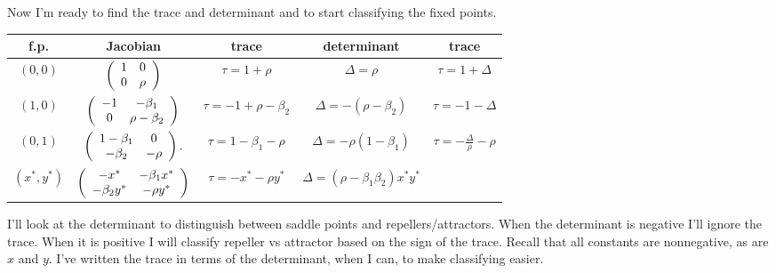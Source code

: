 \documentclass[12pt,letterpaper,answers]{exam}
\begin{document}
\begin{questions}
\begin{parts}
\begin{solution}

Now I'm ready to find the trace and determinant and to start classifying the fixed points.

\begin{tabular}{c | c| c| c| c}
f.p. & Jacobian & trace & determinant & trace \\
\hline
$(0,0)$ & $\left(\begin{array}{c c} 1 & 0 \\ 0 & \rho  \end{array}\right) $ & $\tau = 1+\rho$ & $\Delta = \rho$ & $\tau = 1 + \Delta$ \\
\hline
 $(1,0)$ & $\left(\begin{array}{c c}  -1 & -\beta_1 \\ 0 & \rho - \beta_2  \end{array}\right)$ & $\tau = -1 + \rho - \beta_2$ & $\Delta = -(\rho - \beta_2)$ & $\tau = -1 -\Delta$ \\
 \hline
 $(0,1)$ & $\left(\begin{array}{c c} 1-\beta_1 & 0 \\ -\beta_2 & - \rho   \end{array}\right).$ & $\tau = 1-\beta_1 - \rho$ & $\Delta = -\rho(1-\beta_1)$ & $\tau = -\frac{\Delta}{\rho} - \rho$ \\
\hline
 $(x^*,y^*)$ & $\left(\begin{array}{c c}  - x^* & -\beta_1 x^* \\ -\beta_2 y^* & - \rho y^*  \end{array}\right) $ & $\tau = -x^* - \rho y^*$ & $\Delta = (\rho -\beta_1\beta_2) x^*y^*$
\end{tabular}
\vfill


I'll look at the determinant to distinguish between saddle points and repellers/attractors.  When the determinant is negative I'll ignore the trace.  When it is positive I will classify repeller vs attractor based on the sign of the trace.  Recall that all constants are nonnegative, as are $x$ and $y$.  I've written the trace in terms of the determinant, when I can, to make classifying easier.


\end{solution}
\end{parts}
\end{questions}
\end{document}
